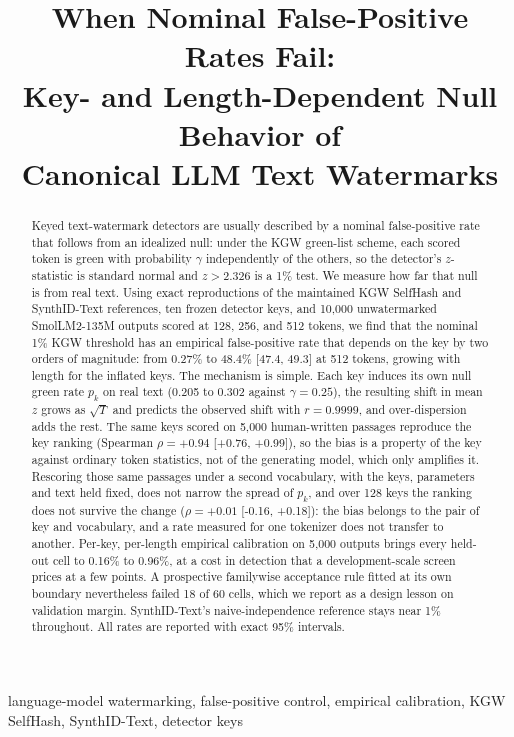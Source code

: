 \documentclass[conference]{IEEEtran}
\title{When Nominal False-Positive Rates Fail:\\
Key- and Length-Dependent Null Behavior of\\
Canonical LLM Text Watermarks}
\author{\IEEEauthorblockN{Nisaharan Genhatharan}
\IEEEauthorblockA{\textit{UNSW Sydney}\\
Sydney, Australia}}
\begin{document}
\maketitle

\begin{abstract}
Keyed text-watermark detectors are usually described by a nominal false-positive
rate that follows from an idealized null: under the KGW green-list scheme, each
scored token is green with probability $\gamma$ independently of the others, so
the detector's $z$-statistic is standard normal and $z>2.326$ is a 1\% test. We
measure how far that null is from real text. Using exact reproductions of the
maintained KGW SelfHash and SynthID-Text references, ten frozen detector keys, and
10,000 unwatermarked SmolLM2-135M outputs scored at 128, 256, and 512 tokens, we
find that the nominal 1\% KGW threshold has an empirical false-positive rate that
depends on the key by two orders of magnitude: from 0.27\% to 48.4\% [47.4, 49.3]
at 512 tokens, growing with length for the inflated keys. The mechanism is simple.
Each key induces its own null green rate $p_k$ on real text (0.205 to 0.302 against
$\gamma=0.25$), the resulting shift in mean $z$ grows as $\sqrt{T}$ and predicts
the observed shift with $r=0.9999$, and over-dispersion adds the rest. The same
keys scored on 5,000 human-written passages reproduce the key ranking
(Spearman $\rho=+0.94$ [+0.76, +0.99]), so the bias is a property of the key
against ordinary token statistics, not of the generating model, which only
amplifies it. Rescoring those same passages under a second vocabulary, with the
keys, parameters and text held fixed, does not narrow the spread of
$p_k$, and over 128 keys the ranking does not survive the change
($\rho=+0.01$ [-0.16, +0.18]): the bias belongs to the pair of key and
vocabulary, and a rate measured for one tokenizer does not transfer to another. Per-key,
per-length empirical calibration on 5,000 outputs brings every held-out cell to
0.16\% to 0.96\%, at a cost in detection that a development-scale screen prices
at a few points. A prospective familywise acceptance rule fitted at its own
boundary nevertheless failed 18 of 60 cells, which we report as a design lesson on
validation margin. SynthID-Text's naive-independence reference stays near 1\%
throughout. All rates are reported with exact 95\% intervals.
\end{abstract}

\begin{IEEEkeywords}
language-model watermarking, false-positive control, empirical calibration,
KGW SelfHash, SynthID-Text, detector keys
\end{IEEEkeywords}
\end{document}

